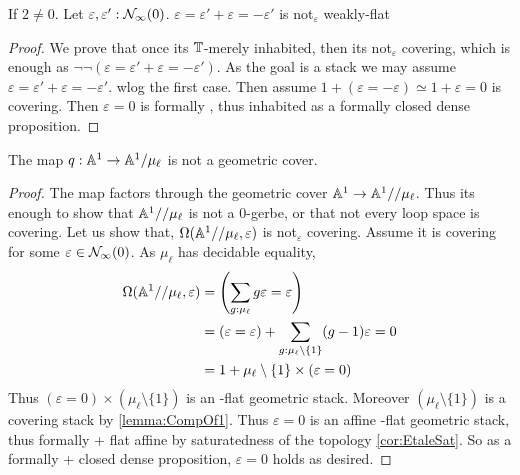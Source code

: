 \documentclass{article}
\begin{document}
\begin{rmk}
	If $2 \neq 0$. Let $\varepsilon , \varepsilon' : \mathcal{N}_\infty(0)$. $\varepsilon = \varepsilon' + \varepsilon = -\varepsilon'$ is not$_\varepsilon$ weakly-flat
\end{rmk}
\begin{proof}
	We prove that once its $\mathbb{T}$-merely inhabited, then its not$_\varepsilon$ covering, which is enough as $\lnot \lnot (\varepsilon = \varepsilon' + \varepsilon = -\varepsilon')$.%
	As the goal is a stack we may assume $\varepsilon = \varepsilon' + \varepsilon = -\varepsilon' $. wlog the first case. Then assume $1 + (\varepsilon = - \varepsilon) \simeq 1 + \varepsilon = 0$ is covering. Then $\varepsilon = 0$ is formally \etale, thus inhabited as a formally \etale closed dense proposition. %
\end{proof}
\begin{example}[Obsolete]
	The map $q : \mathbb{A}^1 \to \mathbb{A}^1 / \mu_\ell$ is not a geometric cover.
\end{example}
\begin{proof}
	The map factors through the geometric cover $\mathbb{A}^1 \to \mathbb{A}^1 // \mu_\ell$. Thus its enough to show that $\mathbb{A}^1 // \mu_\ell$ is not a 0-gerbe, or that not every loop space is covering. 
	Let us show that, $\Omega(\mathbb{A}^1 // \mu_\ell ,\varepsilon)$ is not$_\varepsilon$ covering. Assume it is covering for some $\varepsilon \in \mathcal{N}_\infty(0)$.
	As $\mu_\ell$ has decidable equality,
	\begin{align*}
		\Omega(\mathbb{A}^1 // \mu_\ell , \varepsilon) &= \left (\sum_{g : \mu_\ell} g \varepsilon = \varepsilon \right) \\
		&=  (\varepsilon = \varepsilon) + \sum_{g : \mu_\ell \setminus \{1\}} (g-1) \varepsilon = 0 \\ &= 1 + \mu_\ell \setminus \{1\} \times (\varepsilon = 0) 
	\end{align*}
	Thus $(\varepsilon = 0) \times (\mu_\ell \setminus \{1\})$ is an \etale-flat geometric stack. Moreover $(\mu_\ell \setminus \{1\})$ is a covering stack by \ref{lemma:CompOf1}. Thus $\varepsilon = 0$ is an affine \etale-flat geometric stack, thus formally \etale + flat affine by saturatedness of the \etale topology \ref{cor:EtaleSat}. So as a formally \etale + closed dense proposition, $\varepsilon = 0$ holds as desired. %
\end{proof}
\printbibliography
\end{document}
